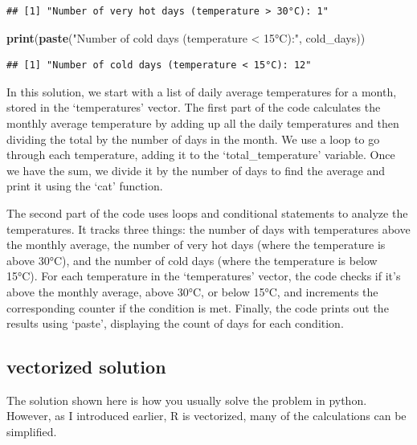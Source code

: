 \documentclass[
]{book}
\newenvironment{Shaded}{\begin{snugshade}}{\end{snugshade}}
\newcommand{\FunctionTok}[1]{\textcolor[rgb]{0.13,0.29,0.53}{\textbf{#1}}}
\newcommand{\NormalTok}[1]{#1}
\newcommand{\StringTok}[1]{\textcolor[rgb]{0.31,0.60,0.02}{#1}}
\begin{document}
\begin{verbatim}
## [1] "Number of very hot days (temperature > 30°C): 1"
\end{verbatim}

\begin{Shaded}
\begin{Highlighting}[]
\FunctionTok{print}\NormalTok{(}\FunctionTok{paste}\NormalTok{(}\StringTok{"Number of cold days (temperature \textless{} 15°C):"}\NormalTok{, cold\_days))}
\end{Highlighting}
\end{Shaded}

\begin{verbatim}
## [1] "Number of cold days (temperature < 15°C): 12"
\end{verbatim}

In this solution, we start with a list of daily average temperatures for a month, stored in the `temperatures' vector. The first part of the code calculates the monthly average temperature by adding up all the daily temperatures and then dividing the total by the number of days in the month. We use a loop to go through each temperature, adding it to the `total\_temperature' variable. Once we have the sum, we divide it by the number of days to find the average and print it using the `cat' function.

The second part of the code uses loops and conditional statements to analyze the temperatures. It tracks three things: the number of days with temperatures above the monthly average, the number of very hot days (where the temperature is above 30°C), and the number of cold days (where the temperature is below 15°C). For each temperature in the `temperatures' vector, the code checks if it's above the monthly average, above 30°C, or below 15°C, and increments the corresponding counter if the condition is met. Finally, the code prints out the results using `paste', displaying the count of days for each condition.

\hypertarget{vectorized-solution}{%
\subsection{vectorized solution}\label{vectorized-solution}}

The solution shown here is how you usually solve the problem in python. However, as I introduced earlier, R is vectorized, many of the calculations can be simplified.
\end{document}

